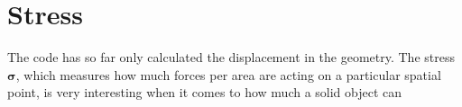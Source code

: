 \section{Stress}

The code has so far only calculated the displacement in the geometry. The stress $\bm{\sigma}$, which measures how much forces per area are acting on a particular spatial point, is very interesting when it comes to how much a solid object can 


